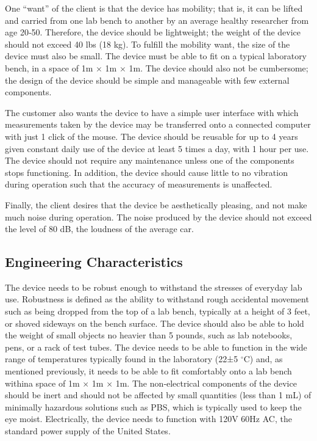 \documentclass{article}
\begin{document}
One ``want'' of the client is that the device has mobility; that is,
it can be lifted and carried from one lab bench to another by an
average healthy researcher from age 20‐50. Therefore, the device
should be lightweight; the weight of the device should not exceed 40
lbs (18 kg).\cite{gross03} To fulfill the mobility want, the size of
the device must also be small. The device must
be able to fit on a typical laboratory bench, in a space of 1m $\times$ 1m $\times$ 1m. The device should also not be cumbersome; the design of the device should be
simple and manageable with few external components.

The customer also wants the device to have a simple user interface with which measurements taken by the device may be transferred onto a connected computer with just 1 click of the mouse. The device should  be reusable for up to 4 years given constant daily use of the device at least 5 times a day, with 1 hour per use.\cite{keyence01} The device should not require any maintenance unless one of the components stops functioning.\cite{keyence01} In addition, the device should cause little to no vibration during operation such that the accuracy of measurements is unaffected. 

Finally, the client desires that the device be aesthetically pleasing, and not make much noise during operation. The noise produced by the device should not exceed the level of 80 dB, the loudness of the average car.\cite{truax09}

\subsection{Engineering Characteristics}
\label{sec:eng-char}
The device needs to be robust enough to withstand the stresses of
everyday lab use. Robustness is defined as the ability to withstand
rough accidental movement such as being dropped from the top of a lab
bench, typically at a height of 3 feet, or shoved sideways on the
bench surface. The device should also be able to hold the weight of
small objects no heavier than 5 pounds, such as lab notebooks, pens,
or a rack of test tubes. The device needs to be able to function in
the wide range of temperatures typically found in the laboratory (22±5
$^\circ$C) and, as mentioned previously, it needs to be able to fit comfortably onto a lab bench withina space of 1m $\times$ 1m $\times$ 1m. The non‐electrical components
of the device should be inert and should not be affected by small
quantities (less than 1 mL) of minimally hazardous solutions such as
PBS,\cite{users_manual} which is typically used to keep the eye
moist. Electrically, the device needs to function with 120V 60Hz AC,
the standard power supply of the United States.
\end{document}
